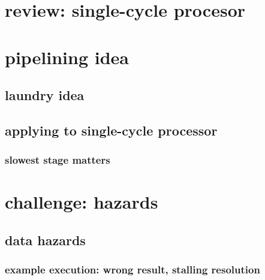 \date{}
\title{}
\date{}

\begin{frame}
    \titlepage
\end{frame}



\section{review: single-cycle procesor}





\section{pipelining idea}

\subsection{laundry idea}



\subsection{applying to single-cycle processor}


\subsubsection{slowest stage matters}




\section{challenge: hazards}

\subsection{data hazards}

\subsubsection{example execution: wrong result, stalling resolution}


